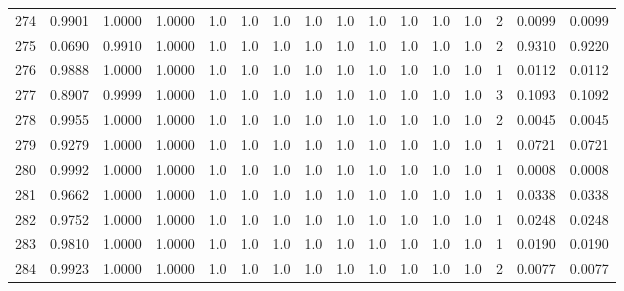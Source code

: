 \begin{tabular}{lrrrrrrrrrrrrrrr}
274 &      0.9901 &  1.0000 &  1.0000 &     1.0 &     1.0 &     1.0 &     1.0 &     1.0 &     1.0 &     1.0 &      1.0 &        1.0 &      2 &                    0.0099 &                     0.0099 \\
275 &      0.0690 &  0.9910 &  1.0000 &     1.0 &     1.0 &     1.0 &     1.0 &     1.0 &     1.0 &     1.0 &      1.0 &        1.0 &      2 &                    0.9310 &                     0.9220 \\
276 &      0.9888 &  1.0000 &  1.0000 &     1.0 &     1.0 &     1.0 &     1.0 &     1.0 &     1.0 &     1.0 &      1.0 &        1.0 &      1 &                    0.0112 &                     0.0112 \\
277 &      0.8907 &  0.9999 &  1.0000 &     1.0 &     1.0 &     1.0 &     1.0 &     1.0 &     1.0 &     1.0 &      1.0 &        1.0 &      3 &                    0.1093 &                     0.1092 \\
278 &      0.9955 &  1.0000 &  1.0000 &     1.0 &     1.0 &     1.0 &     1.0 &     1.0 &     1.0 &     1.0 &      1.0 &        1.0 &      2 &                    0.0045 &                     0.0045 \\
279 &      0.9279 &  1.0000 &  1.0000 &     1.0 &     1.0 &     1.0 &     1.0 &     1.0 &     1.0 &     1.0 &      1.0 &        1.0 &      1 &                    0.0721 &                     0.0721 \\
280 &      0.9992 &  1.0000 &  1.0000 &     1.0 &     1.0 &     1.0 &     1.0 &     1.0 &     1.0 &     1.0 &      1.0 &        1.0 &      1 &                    0.0008 &                     0.0008 \\
281 &      0.9662 &  1.0000 &  1.0000 &     1.0 &     1.0 &     1.0 &     1.0 &     1.0 &     1.0 &     1.0 &      1.0 &        1.0 &      1 &                    0.0338 &                     0.0338 \\
282 &      0.9752 &  1.0000 &  1.0000 &     1.0 &     1.0 &     1.0 &     1.0 &     1.0 &     1.0 &     1.0 &      1.0 &        1.0 &      1 &                    0.0248 &                     0.0248 \\
283 &      0.9810 &  1.0000 &  1.0000 &     1.0 &     1.0 &     1.0 &     1.0 &     1.0 &     1.0 &     1.0 &      1.0 &        1.0 &      1 &                    0.0190 &                     0.0190 \\
284 &      0.9923 &  1.0000 &  1.0000 &     1.0 &     1.0 &     1.0 &     1.0 &     1.0 &     1.0 &     1.0 &      1.0 &        1.0 &      2 &                    0.0077 &                     0.0077 \\

\end{tabular}
